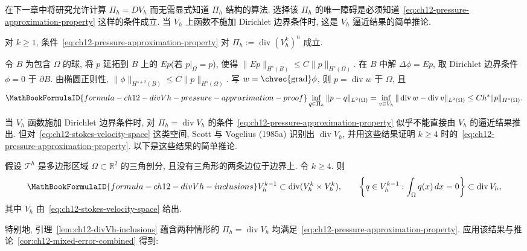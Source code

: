 在下一章中将研究允许计算 $\Pi_h=DV_h$ 而无需显式知道 $\Pi_h$ 结构的算法. 选择该 $\Pi_h$ 的唯一障碍是必须知道~\eqref{eq:ch12-pressure-approximation-property} 这样的条件成立. 当 $V_h$ 上函数不施加 Dirichlet 边界条件时, 这是 $V_h$ 逼近结果的简单推论.

\begin{Lemma}
\label{lem:ch12-divVh-pressure-approximation-no-boundary}
对 $k\geq1$, 条件~\eqref{eq:ch12-pressure-approximation-property} 对
$\Pi_h:=\operatorname{div}(V_h^k)^n$ 成立.
\end{Lemma}

\begin{Proof}
令 $B$ 为包含 $\Omega$ 的球, 将 $p$ 延拓到 $B$ 上的 $Ep$(若 $p|_\Omega=p$), 使得
$\|Ep\|_{H^s(B)}\leq C\|p\|_{H^s(\Omega)}$. 在 $B$ 中解 $\Delta\phi=Ep$, 取 Dirichlet 边界条件 $\phi=0$ 于 $\partial B$. 由椭圆正则性,
$\|\phi\|_{H^{s+2}(B)}\leq C\|p\|_{H^s(\Omega)}$. 写 $w=\chvec{\operatorname{grad}}\phi$, 则 $p=\operatorname{div}w$ 于 $\Omega$, 且
\[
\MathBookFormulaID{formula-ch12-divVh-pressure-approximation-proof}
\inf_{q\in\Pi_h}\|p-q\|_{L^2(\Omega)}
=\inf_{v\in V_h}\|\operatorname{div}w-\operatorname{div}v\|_{L^2(\Omega)}
\leq Ch^s\|p\|_{H^s(\Omega)}.
\]
\end{Proof}

当 $V_h$ 函数施加 Dirichlet 边界条件时, 对 $\Pi_h=\operatorname{div}V_h$ 的条件~\eqref{eq:ch12-pressure-approximation-property} 似乎不能直接由 $V_h$ 的逼近结果推出. 但对~\eqref{eq:ch12-stokes-velocity-space} 这类空间, Scott 与 Vogelius (1985a) 识别出 $\operatorname{div}V_h$, 并用这些结果证明 $k\geq4$ 时的~\eqref{eq:ch12-pressure-approximation-property}. 以下是这些结果的简单推论.

\begin{Lemma}
\label{lem:ch12-divVh-inclusions}
假设 $\mathcal T^h$ 是多边形区域 $\Omega\subset\mathbb R^2$ 的三角剖分, 且没有三角形的两条边位于边界上. 令 $k\geq4$. 则
\[
\MathBookFormulaID{formula-ch12-divVh-inclusions}
V_h^{k-1}\subset\operatorname{div}(V_h^k\times V_h^k),
\qquad
\left\{q\in V_h^{k-1}:\int_\Omega q(x)\,dx=0\right\}
\subset\operatorname{div}V_h,
\]
其中 $V_h$ 由~\eqref{eq:ch12-stokes-velocity-space} 给出.
\end{Lemma}

特别地, 引理~\ref{lem:ch12-divVh-inclusions} 蕴含两种情形的 $\Pi_h=\operatorname{div}V_h$ 均满足~\eqref{eq:ch12-pressure-approximation-property}. 应用该结果与推论~\ref{cor:ch12-mixed-error-combined} 得到:

